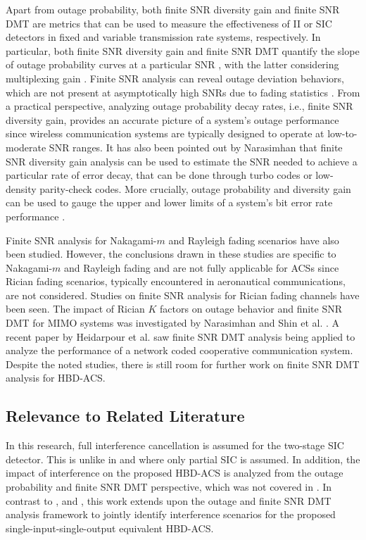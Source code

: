 Apart from outage probability, both finite SNR diversity gain and finite SNR DMT are metrics that can be used to measure the effectiveness of II or SIC detectors in fixed and variable transmission rate systems, respectively. In particular, both finite SNR diversity gain and finite SNR DMT quantify the slope of outage probability curves at a particular SNR \cite{shin2008diversity}, with the latter considering multiplexing gain \cite{narasimhan2006finite}. Finite SNR analysis can reveal outage deviation behaviors, which are not present at asymptotically high SNRs due to fading statistics \cite{shin2008diversity}. From a practical perspective, analyzing outage probability decay rates, i.e., finite SNR diversity gain, provides an accurate picture of a system's outage performance since wireless communication systems are typically designed to operate at low-to-moderate SNR ranges. It has also been pointed out by Narasimhan \cite{narasimhan2006finite} that finite SNR diversity gain analysis can be used to estimate the SNR needed to achieve a particular rate of error decay, that can be done through turbo codes or low-density parity-check codes. More crucially, outage probability and diversity gain can be used to gauge the upper and lower limits of a system's bit error rate performance \cite{zheng2003diversity,nabar2005diversity}. 

Finite SNR analysis for Nakagami-$m$ \cite{wang2012finite} and Rayleigh fading \cite{lin2013outage,yang2015efficient} scenarios have also been studied. However, the conclusions drawn in these studies are specific to Nakagami-$m$ and Rayleigh fading and are not fully applicable for ACSs since Rician fading scenarios, typically encountered in aeronautical communications, are not considered. Studies on finite SNR analysis for Rician fading channels have been seen. The impact of Rician $K$ factors on outage behavior and finite SNR DMT for MIMO systems was investigated by Narasimhan \cite{narasimhan2006finite} and Shin et al. \cite{shin2008diversity}. A recent paper by Heidarpour et al. \cite{heidarpour2017finite} saw finite SNR DMT analysis being applied to analyze the performance of a network coded cooperative communication system. Despite the noted studies, there is still room for further work on finite SNR DMT analysis for HBD-ACS.

\subsection{Relevance to Related Literature}
In this research, full interference cancellation is assumed for the two-stage SIC detector. This is unlike in \cite{hasna2003performance} and \cite{romero2008receive} where only partial SIC is assumed. In addition, the impact of interference on the proposed HBD-ACS is analyzed from the outage probability and finite SNR DMT perspective, which was not covered in \cite{li2014linear,cirik2018robust,yao1992investigations,rached2017unified,weber2007transmission,zhang2017full}. In contrast to \cite{shin2008diversity}, \cite{narasimhan2006finite} and \cite{heidarpour2017finite}, this work extends upon the outage and finite SNR DMT analysis framework to jointly identify interference scenarios for the proposed single-input-single-output equivalent HBD-ACS.

